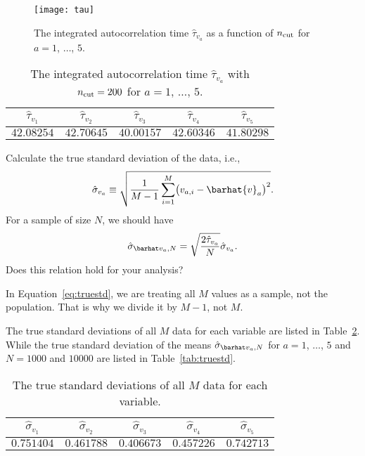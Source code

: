 \begin{figure}[h]
    \centering
    \texttt{[image: tau]}
    \caption{The integrated autocorrelation time $\hat{\tau}_{v_a}$ as a
        function of $n_\textnormal{cut}$ for $a = 1$, $\ldots$, $5$.}
    \label{fig:tau}
\end{figure}

\begin{table}
    \centering
    \caption{The integrated autocorrelation time $\hat{\tau}_{v_a}$ with
        $n_\textnormal{cut} = 200$ for $a = 1$, $\ldots$, $5$.}
    \label{tab:tau}
    \begin{tabular}{@{}ccccc@{}}
        \toprule
        $\hat{\tau}_{v_1}$ & $\hat{\tau}_{v_2}$ & $\hat{\tau}_{v_3}$ & $\hat{\tau}_{v_4}$ & $\hat{\tau}_{v_5}$ \\
        \midrule
        $42.08254$         & $42.70645$         & $40.00157$         & $42.60346$         & $41.80298$         \\
        \bottomrule
    \end{tabular}
\end{table}

\Question{} Calculate the true standard deviation of the data, i.e.,
%
\begin{equation}\label{eq:truestd}
    \hat{\sigma}_{v_a} \equiv \sqrt{\frac{ 1 }{ M - 1 }
        \sum_{i=1}^M \bigl( v_{a,i} - \barhat{v}_a \bigr)^2}.
\end{equation}
%
For a sample of size $N$, we should have
%
\begin{equation}\label{eq:relation}
    \sgbar{a} = \sqrt{\frac{ 2 \hat{\tau}_{v_a} }{ N }} \hat{\sigma}_{v_a}.
\end{equation}
%
Does this relation hold for your analysis?

\Answer{}
In Equation~\eqref{eq:truestd}, we are treating all $M$ values as a sample,
not the population.
That is why we divide it by $M - 1$, not $M$.

The true standard deviations of all $M$ data for each variable are
listed in Table~\ref{tab:std}.
While the true standard deviation of the means
$\sgbar{a}$ for $a = 1$, $\ldots$, $5$ and $N = 1000$ and $10000$ are
listed in Table~\ref{tab:truestd}.

\begin{table}[H]
    \centering
    \caption{The true standard deviations of all $M$ data for each variable.}
    \label{tab:std}
    \begin{tabular}{@{}ccccc@{}}
        \toprule
        $\hat{\sigma}_{v_1}$ & $\hat{\sigma}_{v_2}$ & $\hat{\sigma}_{v_3}$ & $\hat{\sigma}_{v_4}$ & $\hat{\sigma}_{v_5}$ \\
        \midrule
        $0.751404$           & $0.461788$           & $0.406673$           & $0.457226$           & $0.742713$           \\
        \bottomrule
    \end{tabular}
\end{table}

